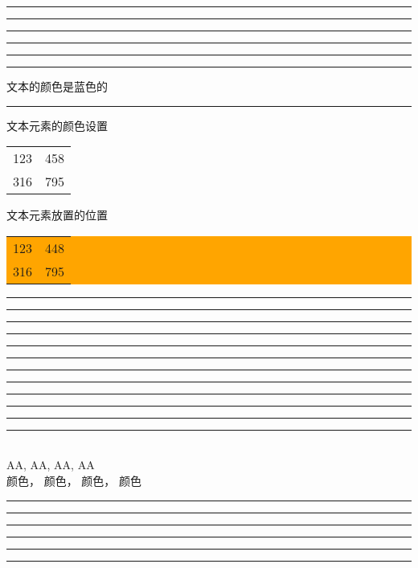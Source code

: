 \documentclass{book}
\begin{document}
\newcommand{\mycolorbox}[1]{\color{#1}\rule{6mm}{4mm}\hspace{7pt}}
\mycolorbox{red!75}
\mycolorbox{red!75!green}
\mycolorbox{red!75!green!50}
\mycolorbox{red!75!green!50!blue}
\mycolorbox{red!75!green!50!blue!25}
\mycolorbox{red!75!green!50!blue!25!gray}

\color{blue}文本的颜色是蓝色的\\
\color[rgb]{1,0,1}\rule{6cm}{1pt}

\textcolor{green!15!blue!95}{文本元素的颜色设置}
\textcolor{orange}{%
\begin{tabular}{|c|c|}\hline
123 & 458 \\
316 & 795 \\ \hline
\end{tabular}
}

\colorbox{green!35!blue!75}{文本元素放置的位置}
\colorbox{orange}{%
\begin{tabular}{|c|c|}\hline
123 & 448 \\
316 & 795 \\ \hline
\end{tabular}
}

\fboxrule=1pt

\newcommand{\MM}{\rule{6mm}{0mm}\rule{6mm}{0mm}}
\newcommand{\R}{\colorbox{mycolors!!+}{\MM}}
\R\R\R\R\R\R\\[9pt]
\color{mycolors!!+}AA,
\color{mycolors!!+}AA,
\color{mycolors!!+}AA,
\color{mycolors!!+}AA \\[9pt]
\textcolor{mycolors!!+}{颜色，}
\textcolor{mycolors!!+}{颜色，}
\textcolor{mycolors!!+}{颜色，}
\textcolor{mycolors!!+}{颜色}\\[9pt]
\colorbox{mycolors!![0]}{\MM}
\colorbox{mycolors!![3]}{\MM}
\colorbox{mycolors!![5]}{\MM}
\end{document}
